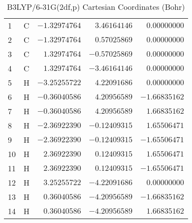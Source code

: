 \documentclass[10pt,oneside]{article}
\begin{document}
\begin{table}[h!]
\centering
\caption{B3LYP/6-31G(2df,p) Cartesian Coordinates (Bohr)}
\begin{tabular}{llrrr}
1  & C  & $-1.32974764$ & $ 3.46164146$ & $ 0.00000000$ \\
2  & C  & $-1.32974764$ & $ 0.57025869$ & $ 0.00000000$ \\
3  & C  & $ 1.32974764$ & $-0.57025869$ & $ 0.00000000$ \\
4  & C  & $ 1.32974764$ & $-3.46164146$ & $ 0.00000000$ \\
5  & H  & $-3.25255722$ & $ 4.22091686$ & $ 0.00000000$ \\
6  & H  & $-0.36040586$ & $ 4.20956589$ & $-1.66835162$ \\
7  & H  & $-0.36040586$ & $ 4.20956589$ & $ 1.66835162$ \\
8  & H  & $-2.36922390$ & $-0.12409315$ & $ 1.65506471$ \\
9  & H  & $-2.36922390$ & $-0.12409315$ & $-1.65506471$ \\
10 & H  & $ 2.36922390$ & $ 0.12409315$ & $ 1.65506471$ \\
11 & H  & $ 2.36922390$ & $ 0.12409315$ & $-1.65506471$ \\
12 & H  & $ 3.25255722$ & $-4.22091686$ & $ 0.00000000$ \\
13 & H  & $ 0.36040586$ & $-4.20956589$ & $-1.66835162$ \\
14 & H  & $ 0.36040586$ & $-4.20956589$ & $ 1.66835162$ \\
\end{tabular}
\end{table}

\clearpage
\end{document}
